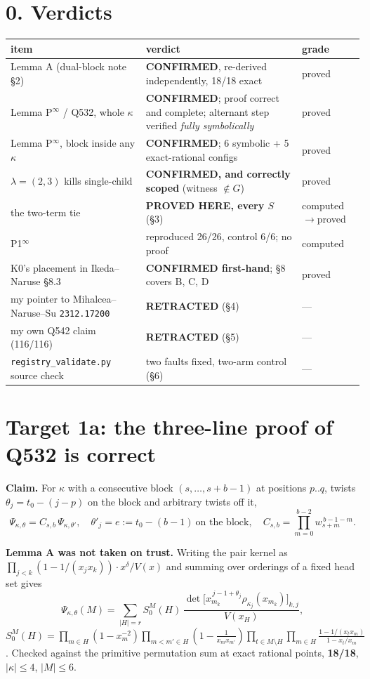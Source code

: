 \documentclass[10pt]{article}
\newcommand{\gr}[1]{\textsf{\small #1}}
\begin{document}
\section*{0. Verdicts}
\begin{longtable}{@{}p{7.1cm}p{6.3cm}p{2.6cm}@{}}
\toprule
item & verdict & grade\\
\midrule
Lemma A (dual-block note \S2) & \textbf{CONFIRMED}, re-derived independently, 18/18 exact & \gr{proved}\\
Lemma P$^\infty$ / Q532, whole $\kappa$ & \textbf{CONFIRMED}; proof correct and complete; alternant step verified \emph{fully symbolically} & \gr{proved}\\
Lemma P$^\infty$, block inside any $\kappa$ & \textbf{CONFIRMED}; 6 symbolic + 5 exact-rational configs & \gr{proved}\\
$\lambda=(2,3)$ kills single-child & \textbf{CONFIRMED, and correctly scoped} (witness $\notin G$) & \gr{proved}\\
the two-term tie & \textbf{PROVED HERE, every $S$} (\S3) & \gr{computed}$\to$\gr{proved}\\
P1$^\infty$ & reproduced 26/26, control 6/6; no proof & \gr{computed}\\
K0's placement in Ikeda--Naruse \S8.3 & \textbf{CONFIRMED first-hand}; \S8 covers B, C, D & \gr{proved}\\
my pointer to Mihalcea--Naruse--Su \texttt{2312.17200} & \textbf{RETRACTED} (\S4) & ---\\
my own Q542 claim (116/116) & \textbf{RETRACTED} (\S5) & ---\\
\texttt{registry\_validate.py} source check & two faults fixed, two-arm control (\S6) & ---\\
\bottomrule
\end{longtable}

\section{Target 1a: the three-line proof of Q532 is correct}
\textbf{Claim.} For $\kappa$ with a consecutive block $(s,\dots,s+b-1)$ at positions $p..q$, twists
$\theta_j=t_0-(j-p)$ on the block and arbitrary twists off it,
\[ \Psi_{\kappa,\theta}=C_{s,b}\,\Psi_{\kappa,\theta'},\quad \theta'_j=e:=t_0-(b-1)\ \text{on the block},\quad
C_{s,b}=\textstyle\prod_{m=0}^{b-2}w_{s+m}^{\,b-1-m}. \]

\textbf{Lemma A was not taken on trust.} Writing the pair kernel as
$\prod_{j<k}(1-1/(x_jx_k))\cdot x^\delta/V(x)$ and summing over orderings of a fixed head set gives
\[ \Psi_{\kappa,\theta}(M)=\sum_{|H|=r}S_0^M(H)\,
\frac{\det\big[x_{m_k}^{\,j-1+\theta_j}\rho_{\kappa_j}(x_{m_k})\big]_{k,j}}{V(x_H)}, \]
$S_0^M(H)=\prod_{m\in H}(1-x_m^{-2})\prod_{m<m'\in H}(1-\tfrac1{x_mx_{m'}})
\prod_{t\in M\setminus H}\prod_{m\in H}\frac{1-1/(x_tx_m)}{1-x_t/x_m}$.
Checked against the primitive permutation sum at exact rational points, \textbf{18/18}, $|\kappa|\le4$, $|M|\le6$.
\end{document}
